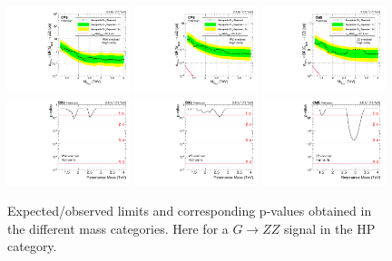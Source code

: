 \begin{figure}[h!]
\centering
\includegraphics[width=0.32\textwidth]{figures/analysis/search1/AN-15-211/limits/brazilianFlag_BulkZZ_WWHP_13TeV_wPDF.pdf}
\includegraphics[width=0.32\textwidth]{figures/analysis/search1/AN-15-211/limits/brazilianFlag_BulkZZ_WZHP_13TeV_wPDF.pdf}
\includegraphics[width=0.32\textwidth]{figures/analysis/search1/AN-15-211/limits/brazilianFlag_BulkZZ_ZZHP_13TeV_wPDF.pdf}\\
\includegraphics[width=0.32\textwidth]{figures/analysis/search1/AN-15-211/pvalues/pvalue_BulkZZinWW_high_purity.pdf}
\includegraphics[width=0.32\textwidth]{figures/analysis/search1/AN-15-211/pvalues/pvalue_BulkZZinWZ_high_purity.pdf}
\includegraphics[width=0.32\textwidth]{figures/analysis/search1/AN-15-211/pvalues/pvalue_BulkZZinZZ_high_purity.pdf}
\caption{Expected/observed limits and corresponding p-values obtained in the different mass categories. Here for a $G\rightarrow ZZ$ signal in the HP category.}
\label{fig:searchI:Limits_HPBulkZZ}
\end{figure}

